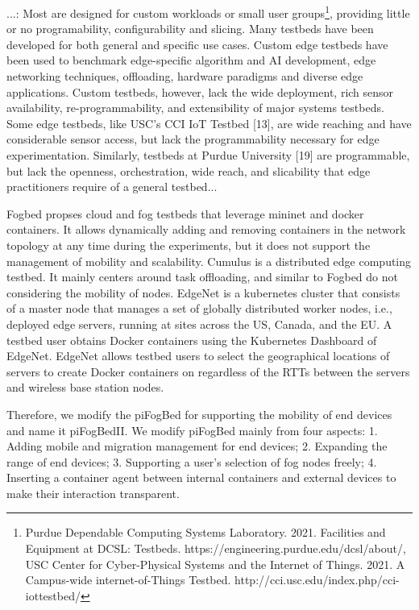 \documentclass[conference]{IEEEtran}
\begin{document}
...\cite{boubin2022prowess}:
Most are designed for custom workloads\cite{meng2019dedas,munoz2017adrenaline,vasisht2017farmbeats} or small user groups\footnote{Purdue Dependable Computing Systems Laboratory. 2021. Facilities and Equipment at DCSL: Testbeds. https://engineering.purdue.edu/dcsl/about/, USC Center for Cyber-Physical Systems and the Internet of Things. 2021. A
Campus-wide internet-of-Things Testbed. http://cci.usc.edu/index.php/cci-iottestbed/}, providing little or no programability, configurability and slicing.
Many testbeds have been developed for both general and specific use cases. Custom edge testbeds have been used to benchmark edge-specific algorithm and AI development\cite{hao2018edge,zhang2019hetero}, edge networking techniques\cite{meng2019dedas,munoz2017adrenaline}, offloading\cite{gedawy2016cumulus}, hardware paradigms\cite{pan2016homecloud} and diverse edge applications\cite{boubin2019managing,vasisht2017farmbeats}. Custom testbeds, however, lack the wide deployment, rich sensor availability, re-programmability, and extensibility of
major systems testbeds. Some edge testbeds, like USC’s CCI IoT Testbed [13], are wide reaching and have considerable sensor access, but lack the programmability necessary for edge experimentation.
Similarly, testbeds at Purdue University [19] are programmable, but lack the openness, orchestration, wide reach, and slicability that edge practitioners require of a general testbed...

\par Fogbed\cite{coutinho2018fogbed} propses cloud and fog testbeds that leverage mininet and docker containers. It allows  dynamically adding and removing containers
in the network topology at any time during the experiments, but it does not support the management of mobility and scalability. Cumulus\cite{gedawy2016cumulus} is a distributed edge computing testbed. It mainly centers around task offloading, and similar to Fogbed\cite{coutinho2018fogbed} do not considering the mobility of nodes.
EdgeNet\cite{cappos2018edgenet} is a kubernetes cluster that consists of a master node that manages a set of globally distributed worker nodes, i.e., deployed edge servers, running at sites across the US, Canada, and the EU. A testbed user obtains Docker containers using the Kubernetes Dashboard of EdgeNet. EdgeNet allows testbed users to select the geographical locations of servers to create Docker containers on regardless of the RTTs between the servers and wireless base station nodes.

Therefore, we modify the piFogBed\cite{xu2020support} for supporting the mobility of end devices and name it
piFogBedII. We modify piFogBed mainly from four aspects:
1. Adding mobile and migration management for end devices;
2. Expanding the range of end devices;
3. Supporting a user’s selection of fog nodes freely;
4. Inserting a container agent between internal containers and external devices to make their
interaction transparent.
\end{document}
